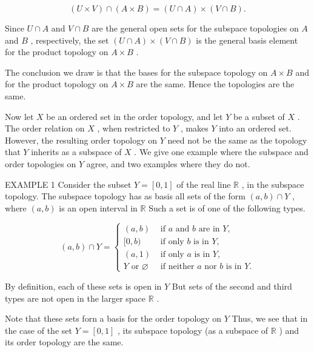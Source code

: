 \documentclass[10pt]{article}
\begin{document}
\[
\left( {U \times  V}\right)  \cap  \left( {A \times  B}\right)  = \left( {U \cap  A}\right)  \times  \left( {V \cap  B}\right) .
\]

Since \(U \cap  A\) and \(V \cap  B\) are the general open sets for the subspace topologies on \(A\) and \(B\) , respectively, the set \(\left( {U \cap  A}\right)  \times  \left( {V \cap  B}\right)\) is the general basis element for the product topology on \(A \times  B\) .

The conclusion we draw is that the bases for the subspace topology on \(A \times  B\) and for the product topology on \(A \times  B\) are the same. Hence the topologies are the same.

Now let \(X\) be an ordered set in the order topology, and let \(Y\) be a subset of \(X\) . The order relation on \(X\) , when restricted to \(Y\) , makes \(Y\) into an ordered set. However, the resulting order topology on \(Y\) need not be the same as the topology that \(Y\) inherits as a subspace of \(X\) . We give one example where the subspace and order topologies on \(Y\) agree, and two examples where they do not.

EXAMPLE 1 Consider the subset \(Y = \left\lbrack  {0,1}\right\rbrack\) of the real line \(\mathbb{R}\) , in the subspace topology. The subspace topology has as basis all sets of the form \(\left( {a,b}\right)  \cap  Y\) , where \(\left( {a,b}\right)\) is an open interval in \(\mathbb{R}\) Such a set is of one of the following types.

\[
\left( {a,b}\right)  \cap  Y = \left\{  \begin{array}{ll} \left( {a,b}\right) & \text{ if }a\text{ and }b\text{ are in }Y, \\  \lbrack 0,b) & \text{ if only }b\text{ is in }Y, \\  \left( {a,1}\right) & \text{ if only }a\text{ is in }Y, \\  Y\text{ or }\varnothing & \text{ if neither }a\text{ nor }b\text{ is in }Y. \end{array}\right.
\]

By definition, each of these sets is open in \(Y\) But sets of the second and third types are not open in the larger space \(\mathbb{R}\) .

Note that these sets forn a basis for the order topology on \(Y\) Thus, we see that in the case of the set \(Y = \left\lbrack  {0,1}\right\rbrack\) , its subspace topology (as a subspace of \(\mathbb{R}\) ) and its order topology are the same.
\end{document}
